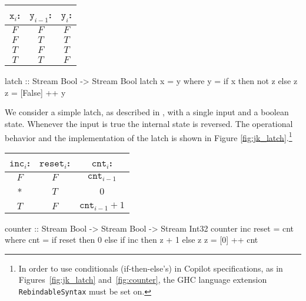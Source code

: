 \begin{figure*}
\begin{minipage}{0.4\linewidth}
\begin{tabular}{c|c||c}
$\mathtt{x}_i$: & $\mathtt{y}_{i-1}$: & $\mathtt{y}_i$:\\
\hline
$F$ & $F$ & $F$ \\
\hline
$F$ & $T$ & $T$ \\
\hline
$T$ & $F$ & $T$ \\
\hline
$T$ & $T$ & $F$
\end{tabular}
\end{minipage}
\hspace{1cm}
\begin{minipage}{0.6\linewidth}
\begin{code}
latch :: Stream Bool -> Stream Bool
latch x = y
  where
  y = if x then not z else z
  z = [False] ++ y
\end{code}
\end{minipage}
\caption{A latch. The specification is provided at the left and the
implementation is provided at the right.}
\label{fig:jk_latch}
\end{figure*}

\begin{example}
We consider a simple latch, as described in \cite{Farhat2004}, with a single
input and a boolean state. Whenever the input is true the internal state is reversed.
The operational behavior and the implementation of the latch is shown in Figure
\ref{fig:jk_latch}.\footnote
{In order
to use conditionals (if-then-else's) in Copilot specifications,
as in Figures~\ref{fig:jk_latch} and~\ref{fig:counter}, the GHC
language extension {\tt RebindableSyntax} must be set on.}
\end{example}

\begin{figure*}
\begin{minipage}{0.4\linewidth}
\begin{tabular}{c|c||c}
$\mathtt{inc}_i$: & $\mathtt{reset}_i$: & $\mathtt{cnt}_i$: \\
\hline
$F$ & $F$ & $\mathtt{cnt}_{i-1}$ \\
\hline
* & $T$ & $0$ \\
\hline
$T$ & $F$ & $\mathtt{cnt}_{i-1} + 1$ \\
\hline
\end{tabular}
\end{minipage}
\hspace{1cm}
\begin{minipage}{0.6\linewidth}
\begin{code}
counter :: Stream Bool -> Stream Bool 
        -> Stream Int32
counter inc reset = cnt
  where 
  cnt = if reset then 0
          else if inc then z + 1
                 else z
  z = [0] ++ cnt
\end{code}
\end{minipage}
\caption{A resettable counter. The specification is provided at the left and the
implementation is provided at the right.
}
\label{fig:counter}
\end{figure*}

